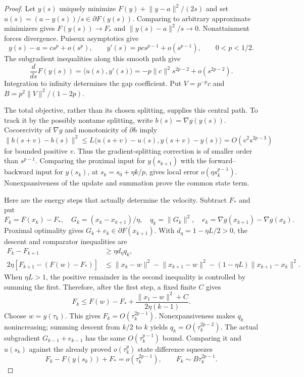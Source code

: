 \documentclass[11pt]{article}
\theoremstyle{remark}\newtheorem{remark}[theorem]{Remark}
\newcommand{\ip}[2]{\langle #1,#2\rangle}\newcommand{\norm}[1]{\lVert #1\rVert}
\numberwithin{equation}{section}
\begin{document}
\begin{proof}
Let $y(s)$ uniquely minimize $F(y)+\norm{y-a}^2/(2s)$ and set $u(s)=(a-y(s))/s\in\partial F(y(s))$. Comparing to arbitrary approximate minimizers gives $F(y(s))\to F_*$ and $\norm{y(s)-a}^2/s\to0$. Nonattainment forces divergence. Puiseux asymptotics give
\[
 y(s)-a=cs^p+o(s^p),\qquad y'(s)=pcs^{p-1}+o(s^{p-1}),\qquad 0<p<1/2.
\]
The subgradient inequalities along this smooth path give
\[
 \frac{d}{ds}F(y(s))=\ip{u(s)}{y'(s)}
 =-p\norm c^2s^{2p-2}+o(s^{2p-2}).
\]
Integration to infinity determines the gap coefficient. Put $V=p^{-p}c$ and $B=p^2\norm V^2/(1-2p)$.

The total objective, rather than its chosen splitting, supplies this central path. To track it by the possibly nontame splitting, write $b(s)=\nabla g(y(s))$. Cocoercivity of $\nabla g$ and monotonicity of $\partial h$ imply
\[
 \norm{b(s+v)-b(s)}^2
 \leq L\ip{u(s+v)-u(s)}{y(s+v)-y(s)}
 =O(v^2s^{2p-3})
\]
for bounded positive $v$. Thus the gradient-splitting correction is of smaller order than $s^{p-1}$. Comparing the proximal input for $y(s_{k+1})$ with the forward--backward input for $y(s_k)$, at $s_k=s_0+\eta k/p$, gives local error $o(\eta s_k^{p-1})$. Nonexpansiveness of the update and summation prove the common state term.

Here are the energy steps that actually determine the velocity. Subtract $F_*$ and put
\[
 F_k=F(x_k)-F_*,\quad G_k=(x_k-x_{k+1})/\eta,\quad
 q_k=\norm{G_k}^2,\quad e_k=\nabla g(x_{k+1})-\nabla g(x_k).
\]
Proximal optimality gives $G_k+e_k\in\partial F(x_{k+1})$. With $d_\eta=1-\eta L/2>0$, the descent and comparator inequalities are
\begin{align*}
 F_k-F_{k+1}&\geq\eta d_\eta q_k,\\
 2\eta[F_{k+1}-(F(w)-F_*)]
 &\leq\norm{x_k-w}^2-\norm{x_{k+1}-w}^2
 -(1-\eta L)\norm{x_{k+1}-x_k}^2.
\end{align*}
When $\eta L>1$, the positive remainder in the second inequality is controlled by summing the first. Therefore, after the first step, a fixed finite $C$ gives
\[
 F_k\leq F(w)-F_*+\frac{\norm{x_1-w}^2+C}{2\eta(k-1)}.
\]
Choose $w=y(\tau_k)$. This gives $F_k=O(\tau_k^{2p-1})$. Nonexpansiveness makes $q_k$ nonincreasing; summing descent from $k/2$ to $k$ yields $q_k=O(\tau_k^{2p-2})$. The actual subgradient $G_{k-1}+e_{k-1}$ has the same $O(\tau_k^{p-1})$ bound. Comparing it and $u(s_k)$ against the already proved $o(\tau_k^p)$ state difference squeezes
\[
 F_k-F(y(s_k))+F_*=o(\tau_k^{2p-1}),\qquad F_k\sim B\tau_k^{2p-1}.
\]


\end{proof}
\end{document}
